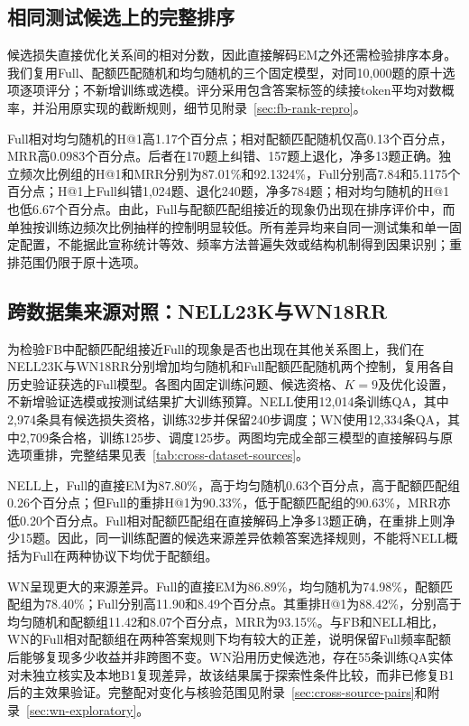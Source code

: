 \subsection{相同测试候选上的完整排序}
\label{sec:fb-rerank}

候选损失直接优化关系间的相对分数，因此直接解码EM之外还需检验排序本身。我们复用Full、配额匹配随机和均匀随机的三个固定模型，对同10,000题的原十选项逐项评分；不新增训练或选模。评分采用包含答案标签的续接token平均对数概率，并沿用原实现的截断规则，细节见附录~\ref{sec:fb-rank-repro}。



Full相对均匀随机的H@1高1.17个百分点；相对配额匹配随机仅高0.13个百分点，MRR高0.0983个百分点。后者在170题上纠错、157题上退化，净多13题正确。独立频次比例组的H@1和MRR分别为87.01\%和92.1324\%，Full分别高7.84和5.1175个百分点；H@1上Full纠错1,024题、退化240题，净多784题；相对均匀随机的H@1也低6.67个百分点。由此，Full与配额匹配组接近的现象仍出现在排序评价中，而单独按训练边频次比例抽样的控制明显较低。所有差异均来自同一测试集和单一固定配置，不能据此宣称统计等效、频率方法普遍失效或结构机制得到因果识别；重排范围仍限于原十选项。

\subsection{跨数据集来源对照：NELL23K与WN18RR}
\label{sec:cross-dataset-sources}

为检验FB中配额匹配组接近Full的现象是否也出现在其他关系图上，我们在NELL23K与WN18RR分别增加均匀随机和Full配额匹配随机两个控制，复用各自历史验证获选的Full模型。各图内固定训练问题、候选资格、$K=9$及优化设置，不新增验证选模或按测试结果扩大训练预算。NELL使用12,014条训练QA，其中2,974条具有候选损失资格，训练32步并保留240步调度；WN使用12,334条QA，其中2,709条合格，训练125步、调度125步。两图均完成全部三模型的直接解码与原选项重排，完整结果见表~\ref{tab:cross-dataset-sources}。



NELL上，Full的直接EM为87.80\%，高于均匀随机0.63个百分点，高于配额匹配组0.26个百分点；但Full的重排H@1为90.33\%，低于配额匹配组的90.63\%，MRR亦低0.20个百分点。Full相对配额匹配组在直接解码上净多13题正确，在重排上则净少15题。因此，同一训练配置的候选来源差异依赖答案选择规则，不能将NELL概括为Full在两种协议下均优于配额组。

WN呈现更大的来源差异。Full的直接EM为86.89\%，均匀随机为74.98\%，配额匹配组为78.40\%；Full分别高11.90和8.49个百分点。其重排H@1为88.42\%，分别高于均匀随机和配额组11.42和8.07个百分点，MRR为93.15\%。与FB和NELL相比，WN的Full相对配额组在两种答案规则下均有较大的正差，说明保留Full频率配额后能够复现多少收益并非跨图不变。WN沿用历史候选池，存在55条训练QA实体对未独立核实及本地B1复现差异，故该结果属于探索性条件比较，而非已修复B1后的主效果验证。完整配对变化与核验范围见附录~\ref{sec:cross-source-pairs}和附录~\ref{sec:wn-exploratory}。


